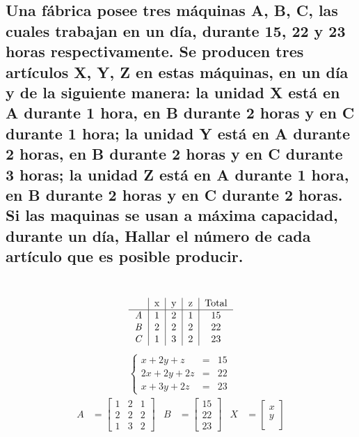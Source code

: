\documentclass[10pt, a4paper]{article}
\begin{document}
\subsection{Una fábrica posee tres máquinas A, B, C, las cuales trabajan en un día, durante 15, 22 y 23 horas respectivamente. Se producen tres artículos X, Y, Z en estas máquinas, en un día y de la siguiente manera: la unidad X está en A durante 1 hora, en B durante 2 horas y en C durante 1 hora; la unidad Y está en A durante 2 horas, en B durante 2 horas y en C durante 3 horas; la unidad Z está en A durante 1 hora, en B durante 2 horas y en C durante 2 horas. Si las maquinas se usan a máxima capacidad, durante un día, Hallar el número de cada artículo que es posible producir.}
\begin{multicols}{2}
\\
\begin{align*}
  \begin{tabular}{c|c|c|c|c}
    & x & y & z & Total\\
    \hline
    \textit{A} & 1 & 2 & 1 & 15\\
    \textit{B} & 2 & 2 & 2 & 22\\
    \textit{C} & 1 & 3 & 2 & 23\\
  \end{tabular}
\end{align*}
\begin{align*}
  \left\{
  \begin{array}{rcl}
    x+2y+z &= &15\\
    2x+2y+2z &= &22\\
    x+3y+2z &= &23
  \end{array}
  \right.\
\end{align*}
\begin{align*}
  A &= \begin{bmatrix}
    1 & 2 & 1\\
    2 & 2 & 2\\
    1 & 3 & 2
  \end{bmatrix}&
  B &= \begin{bmatrix}
    15\\
    22\\
    23
  \end{bmatrix}&
  X &= \begin{bmatrix}
    x\\
    y\\

\end{bmatrix}
\end{align*}
\end{multicols}
\end{document}
